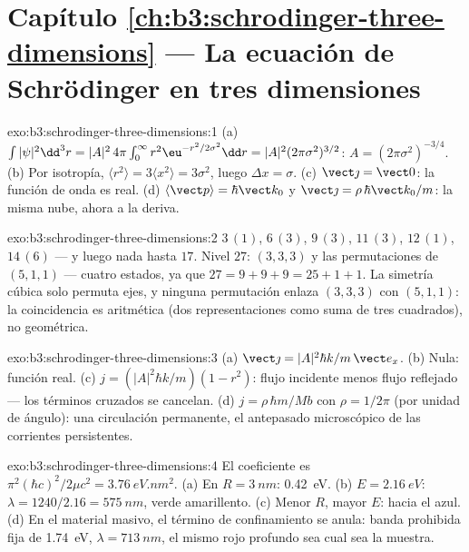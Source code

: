 \section*{Capítulo \ref{ch:b3:schrodinger-three-dimensions} --- La ecuación de Schrödinger en tres dimensiones}

\begin{solution}{exo:b3:schrodinger-three-dimensions:1}
(a) $\int|\psi|^2\dd^3r = |A|^2\,4\pi\int_0^\infty r^2\eu^{-r^2/2
\sigma^2}\dd r = |A|^2(2\pi\sigma^2)^{3/2}$: $A = (2\pi\sigma^2)^{
-3/4}$. (b) Por isotropía, $\langle r^2\rangle = 3\langle x^2\rangle =
3\sigma^2$, luego $\Delta x = \sigma$. (c) $\vect\jmath = \vect 0$: la
función de onda es real. (d) $\langle\vect p\rangle = \hbar\vect k_0$
y $\vect\jmath = \rho\,\hbar\vect k_0/m$: la misma nube, ahora a la
deriva.
\end{solution}

\begin{solution}{exo:b3:schrodinger-three-dimensions:2}
$3\,(1)$, $6\,(3)$, $9\,(3)$, $11\,(3)$, $12\,(1)$, $14\,(6)$ ---
y luego nada hasta $17$. Nivel $27$: $(3,3,3)$ y las permutaciones
de $(5,1,1)$ --- cuatro estados, ya que $27 = 9+9+9 = 25+1+1$. La simetría
cúbica solo permuta ejes, y ninguna permutación enlaza $(3,3,3)$ con
$(5,1,1)$: la coincidencia es aritmética (dos representaciones como suma de
tres cuadrados), no geométrica.
\end{solution}

\begin{solution}{exo:b3:schrodinger-three-dimensions:3}
(a) $\vect\jmath = |A|^2\hbar k/m\,\vect e_x$. (b) Nula: función
real. (c) $j = (|A|^2\hbar k/m)(1 - r^2)$: flujo incidente menos
flujo reflejado --- los términos cruzados se cancelan. (d) $j = \rho\,\hbar
m/Mb$ con $\rho = 1/2\pi$ (por unidad de ángulo): una circulación
permanente, el antepasado microscópico de las corrientes persistentes.
\end{solution}

\begin{solution}{exo:b3:schrodinger-three-dimensions:4}
El coeficiente es $\pi^2(\hbar c)^2/2\mu c^2 = \qty{3.76}{eV.nm^2}$.
(a) En $R = \qty{3}{nm}$: \qty{0.42}{eV}. (b) $E = \qty{2.16}{eV}$:
$\lambda = 1240/2.16 = \qty{575}{nm}$, verde amarillento. (c) Menor $R$,
mayor $E$: hacia el azul. (d) En el material masivo, el término de
confinamiento se anula: banda prohibida fija de \qty{1.74}{eV},
$\lambda = \qty{713}{nm}$, el mismo rojo profundo sea cual sea la muestra.
\end{solution}

